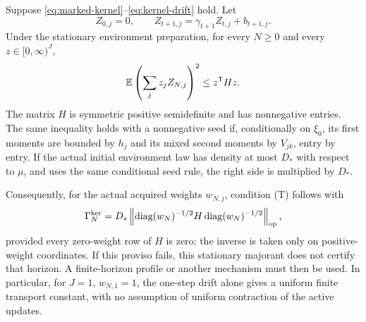 \begin{theorem}\label{thm:kernel}
Suppose \eqref{eq:marked-kernel}--\eqref{eq:kernel-drift} hold. Let
\[
 Z_{0,j}=0,\qquad Z_{t+1,j}=\gamma_{t+1}Z_{t,j}+b_{t+1,j}.
\]
Under the stationary environment preparation, for every $N\ge0$ and every $z\in[0,\infty)^J$,
\begin{equation}\label{eq:kernel-energy}
 \mathbb E\left(\sum_j z_jZ_{N,j}\right)^2\le z^{\mathsf T}Hz.
\end{equation}
The matrix $H$ is symmetric positive semidefinite and has nonnegative entries. The same inequality holds with a nonnegative seed if, conditionally on $\xi_0$, its first moments are bounded by $h_j$ and its mixed second moments by $V_{jk}$, entry by entry. If the actual initial environment law has density at most $D_*$ with respect to $\mu$, and uses the same conditional seed rule, the right side is multiplied by $D_*$.

Consequently, for the actual acquired weights $w_{N,j}$, condition \textup{(T)} follows with
\begin{equation}\label{eq:resolvent-gamma}
 \Gamma_N^{\rm ker}
   =D_*\left\|\operatorname{diag}(w_N)^{-1/2}
                    H\operatorname{diag}(w_N)^{-1/2}\right\|_{\rm op},
\end{equation}
provided every zero-weight row of $H$ is zero; the inverse is taken only on positive-weight coordinates. If this proviso fails, this stationary majorant does not certify that horizon. A finite-horizon profile or another mechanism must then be used. In particular, for $J=1$, $w_{N,1}=1$, the one-step drift alone gives a uniform finite transport constant, with no assumption of uniform contraction of the active updates.
\end{theorem}
